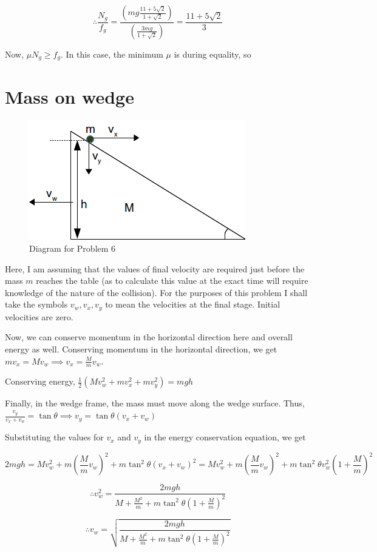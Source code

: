 \documentclass[12pt]{article}
\begin{document}
$$\therefore \frac{N_g}{f_g}=\frac{\left(mg\frac{11+5\sqrt 2}{1+\sqrt 2}\right)}{\left(\frac{3mg}{1+\sqrt 2}\right)}=\frac{11+5\sqrt 2}{3}$$

Now, $\mu N_g\geq f_g$. In this case, the minimum $\mu$ is during equality, so 

\section{Mass on wedge}
\begin{figure}[h]
\centering
\includegraphics[scale=0.4]{6D}
\caption{Diagram for Problem 6}

\label{fig:6d}
\end{figure}

Here, I am assuming that the values of final velocity are required just before the mass $m$ reaches the table (as to calculate this value at the exact time will require knowledge of the nature of the collision). For the purposes of this problem I shall take the symbols $v_w,v_x,v_y$ to mean the velocities at the final stage. Initial velocities are zero.

Now, we can conserve momentum in the horizontal direction here and overall energy as well. Conserving momentum in the horizontal direction, we get $mv_x=Mv_w \implies v_x=\frac Mm v_w$.

Conserving energy, $\frac12(Mv_w^2+mv_x^2+mv_y^2)=mgh$

Finally, in the wedge frame, the mass must move along the wedge surface. Thus, $\frac{v_y}{v_x+v_w}=\tan\theta \implies v_y=\tan\theta (v_x+v_w)$

Substituting the values for $v_x$ and $v_y$ in the energy conservation equation, we get 

$$2mgh= Mv_w^2+ m\left(\frac{M}m v_w\right)^2+m\tan^2\theta (v_x+v_w)^2=Mv_w^2+ m\left(\frac{M}m v_w\right)^2+m\tan^2\theta v_w^2 \left(1+\frac{M}{m}\right)^2$$


$$\therefore v_w^2 = \frac{2mgh}{M+\frac{M^2}{m} + m\tan^2\theta \left(1+\frac{M}m\right)^2}$$

$$\therefore \boxed{v_w=\sqrt{\frac{2mgh}{M+\frac{M^2}{m} + m\tan^2\theta \left(1+\frac{M}m\right)^2}}}$$
\end{document}
